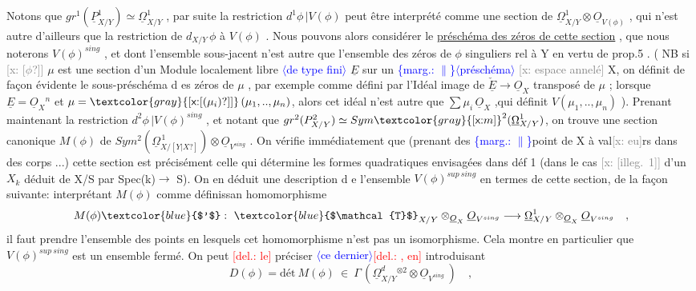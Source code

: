 \documentclass[11pt]{article}
\newcommand{\hand}[1]{\textcolor{blue}{#1}}
\newcommand{\inserted}[2][]{\textcolor{blue}{$\langle$#2$\rangle$}}
\newcommand{\margin}[1]{\textcolor{blue}{\{\textsf{marg.:} #1\}}}
\newcommand{\deleted}[1]{\textcolor{red}{[\textsf{del.:} #1]}}
\newcommand{\xout}[1]{\textcolor{gray}{[\textsf{x:} #1]}}
\newcommand{\uline}[1]{\underline{#1}}
\newcommand{\unsure}[1]{[#1?]}
\newcommand{\illegible}[1]{[\textsf{illeg.\ #1}]}
\begin{document}
Notons que $gr^1(\underline{P}^1_{X/Y}) \simeq \underline{\Omega}^1_{X/Y}$ , par suite la restriction
$d^1\phi\,|V(\phi)$ peut être interprété comme une section de $\underline{\Omega}^1_{X/Y} \otimes \underline{O}_{V(\phi)}$ ,
qui n'est autre d'ailleurs que la restriction de $d_{X/Y}\,\phi$ à $V(\phi)$ . Nous
pouvons alors considérer le \uline{préschéma des zéros de cette section} , que
nous noterons $V(\phi)^{sing}$ , et dont l'ensemble sous-jacent n'est autre
que l'ensemble des zéros de $\phi$ singuliers rel à Y en vertu de prop.5 .
( NB si \xout{\unsure{$\phi$}} $\mu$ est une section d'un Module localement libre \inserted[typed]{de type fini} $\underline{E}$ sur un
\margin{$\|$}\inserted[typed]{préschéma} \xout{espace annelé} X, on définit de façon évidente le sous-préschéma d es
zéros de $\mu$ , par exemple comme défini par l'Idéal image de $\check{\underline{E}} \longrightarrow \underline{O}_X$
transposé de $\mu$ ; lorsque $\underline{E} = \underline{O}_X{}^n$ et $\mu = \xout{\unsure{(\mu_i)}}\,(\mu_1,..,\mu_n)$, alors cet
idéal n'est autre que $\sum \mu_i\,\underline{O}_X$ ,qui définit $V(\mu_1,..,\mu_n)$ ). Prenant
maintenant la restriction $d^2\phi\,|V(\phi)^{sing}$ , et notant que
$gr^2(P^2_{X/Y}) \simeq Sym\xout{m}^2(\underline{\Omega}^1_{X/Y})$, on trouve une section canonique $M(\phi)$ de
$Sym^2(\underline{\Omega}^{\,1}_{X/\unsure{Y|X}}) \otimes \underline{O}_{V^{sing}}$ . On vérifie immédiatement que (prenant des
\margin{$\|$}point de X à val\xout{eu}rs dans des corps ...) cette section est précisément
celle qui détermine les formes quadratiques envisagées dans déf 1
(dans le cas \xout{\illegible{1}} d'un $X_k$ déduit de X/S par Spec(k)$\rightarrow$ S). On
en déduit une description d e l'ensemble $V(\phi)^{sup\ sing}$ en termes de
cette section, de la façon suivante: interprétant $M(\phi)$ comme définissan
homomorphisme
\[
M(\phi)\hand{$'$} : \ \hand{$\mathcal{T}$}_{X/Y} \otimes_{\underline{O}_X} \underline{O}_{V^{sing}} \longrightarrow \underline{\Omega}^1_{X/Y} \otimes_{\underline{O}_X} \underline{O}_{V^{sing}} \quad ,
\]
il faut prendre l'ensemble des points en lesquels cet homomorphisme
n'est pas un isomorphisme. Cela montre en particulier que $V(\phi)^{sup\ sing}$
est un ensemble fermé. On peut \deleted{le} préciser \inserted{ce dernier}\deleted{, en} introduisant
\[
D(\phi) = \text{dét}\ M(\phi) \ \in \ \Gamma\,(\underline{\Omega}^d_{X/Y}{}^{\otimes 2} \otimes \underline{O}_{V^{sing}}\ ) \quad ,
\]
\end{document}
